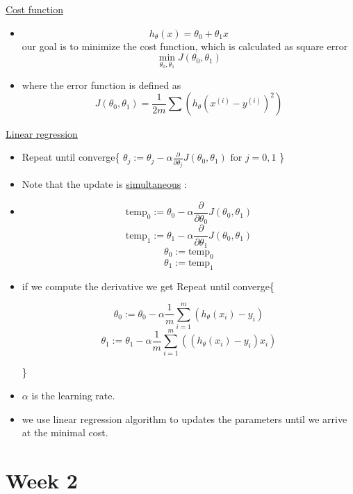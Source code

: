 \documentclass[12pt]{article}
\begin{document}
\underline{Cost function}\\
\begin{itemize}
	\item \[h_{\theta}(x) = \theta_0 + \theta_1x\]
	 our goal is to minimize the cost function, which is calculated as square error
	 \[\min_{\theta_0,\theta_1} J(\theta_0,\theta_1)\]
	\item where the error function is defined as
	 \[J(\theta_0,\theta_1) = \frac{1}{2m} \sum_{}^{}(h_\theta(x^{(i)} - y ^{(i)})^2)\]
\end{itemize}

\underline{Linear regression}
\begin{center}
	\begin{itemize}
		\item 	Repeat until converge\{
		$  \theta_j := \theta_j - \alpha\frac{\partial}{\partial \theta_j}J(\theta_0,\theta_1) \text{ for } j = 0,1 $ \}	
		\item  Note that the update is \underline{simultaneous} :
		\item 
		\[ \text{temp}_0 := \theta_0 - \alpha\frac{\partial}{\partial \theta_0}J(\theta_0,\theta_1) \] 
		\[ \text{temp}_1 := \theta_1 - \alpha\frac{\partial}{\partial \theta_1}J(\theta_0,\theta_1) \]
		\[\theta_0 := \text{temp}_0 \]
		\[\theta_1 := \text{temp}_1\]
		\item if we compute the derivative we get
		Repeat until converge\{
		
		\[ \theta_0 := \theta_0 - \alpha\frac{1}{m}\sum_{i=1}^{m}(h_{\theta}(x_i)-y_i) \] 
		\[ \theta_1 := \theta_1 - \alpha\frac{1}{m}\sum_{i=1}^{m}((h_{\theta}(x_i)-y_i) x_i)\] 
		
		\}	
		
		\item $\alpha$ is the learning rate. 
		\item we use linear regression algorithm to updates the parameters until we arrive at the minimal cost.
	\end{itemize}

\end{center}
\newpage
\section*{Week 2}
\end{document}
